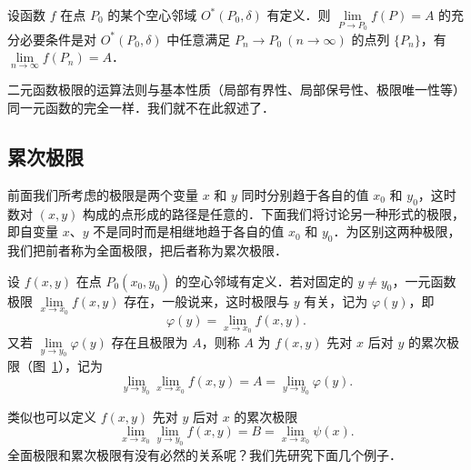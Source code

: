 \begin{theorem}[海涅]\label{thm:15-5}
设函数 $f$ 在点 $P_{0}$ 的某个空心邻域 $O^{*}(P_{0},\delta)$ 有定义．则 $\lim\limits_{P\to P_{0}}f(P)=A$ 的充分必要条件是对 $O^{*}(P_{0},\delta)$ 中任意满足 $P_{n}\to P_{0}\ (n\to\infty)$ 的点列 $\{P_{n}\}$，有 $\lim\limits_{n\to\infty}f(P_{n})=A$．
\end{theorem}

二元函数极限的运算法则与基本性质（局部有界性、局部保号性、极限唯一性等）同一元函数的完全一样．我们就不在此叙述了．

\subsection{累次极限}

前面我们所考虑的极限是两个变量 $x$ 和 $y$ 同时分别趋于各自的值 $x_{0}$ 和 $y_{0}$，这时数对 $(x,y)$ 构成的点形成的路径是任意的．下面我们将讨论另一种形式的极限，即自变量 $x$、$y$ 不是同时而是相继地趋于各自的值 $x_{0}$ 和 $y_{0}$．为区别这两种极限，我们把前者称为全面极限，把后者称为累次极限．

设 $f(x,y)$ 在点 $P_{0}(x_{0},y_{0})$ 的空心邻域有定义．若对固定的 $y\neq y_{0}$，一元函数极限 $\lim\limits_{x\to x_{0}}f(x,y)$ 存在，一般说来，这时极限与 $y$ 有关，记为 $\varphi(y)$，即
\[
\varphi\left(y\right)=\lim_{x\to x_{0}}f\left(x,y\right).
\]
又若 $\lim\limits_{y\to y_{0}}\varphi(y)$ 存在且极限为 $A$，则称 $A$ 为 $f(x,y)$ 先对 $x$ 后对 $y$ 的累次极限（图~\ref{fig:15-17}），记为
\[
\lim_{y\to y_{0}}\lim_{x\to x_{0}}f(x,y)=A=\lim_{y\to y_{0}}\varphi(y).
\]

\begin{figure}[htbp]
\centering
{}\caption{\relax}\label{fig:15-17}
\end{figure}

类似也可以定义 $f(x,y)$ 先对 $y$ 后对 $x$ 的累次极限
\[
\lim_{x\to x_{0}}\lim_{y\to y_{0}}f(x,y)=B=\lim_{x\to x_{0}}\psi(x).
\]
全面极限和累次极限有没有必然的关系呢？我们先研究下面几个例子．


